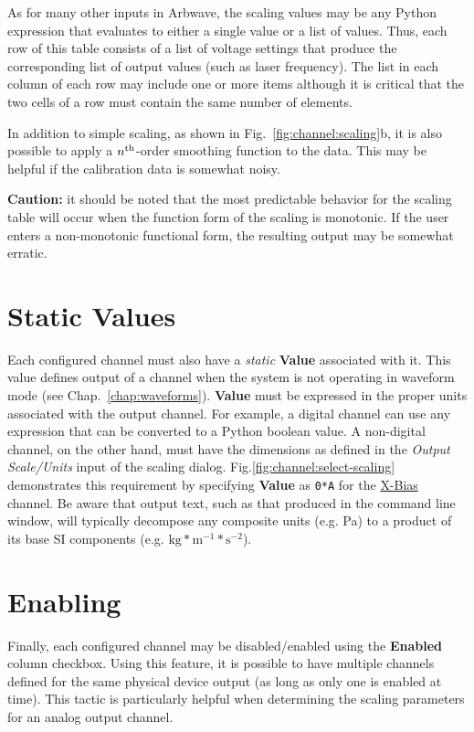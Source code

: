 As for many other inputs in Arbwave, the scaling values may be any Python
expression that evaluates to either a single value or a list of values.  Thus,
each row of this table consists of a list of voltage settings that produce the
corresponding list of output values (such as laser frequency).  The list in each
column of each row may include one or more items although it is critical that
the two cells of a row must contain the same number of elements.

In addition to simple scaling, as shown in Fig.~\ref{fig:channel:scaling}b, it is
also possible to apply a $n^{\rm th}$-order smoothing function to the data.
This may be helpful if the calibration data is somewhat noisy.

\textbf{Caution:}  it should be noted that the most predictable behavior for the
scaling table will occur when the function form of the scaling is monotonic.  If
the user enters a non-monotonic functional form, the resulting output may be
somewhat erratic.

\section{Static Values}\label{sec:channels:static}
Each configured channel must also have a \textit{static} \textbf{Value}
associated with it.  This value defines output of a channel when
the system is not operating in waveform mode (see Chap.~\ref{chap:waveforms}).
\textbf{Value} must be expressed in the proper units associated with the output
channel.  For example, a digital channel can use any expression that can be
converted to a Python boolean value.  A non-digital channel, on the other hand,
must have the dimensions as defined in the \textit{Output Scale/Units} input of
the scaling dialog.  Fig.\ref{fig:channel:select-scaling} demonstrates this
requirement by specifying \textbf{Value} as \texttt{0*A} for the
\underline{X-Bias} channel.  Be aware that output text, such as that produced in
the command line window, will typically decompose
any composite units (e.g. Pa) to a product of its base SI components (e.g.
$\mathrm{kg}*\mathrm{m}^{-1}*\mathrm{s}^{-2}$).

\section{Enabling}\label{sec:channels:enable}
Finally, each configured channel may be disabled/enabled using the
\textbf{Enabled} column checkbox.  Using this feature, it is possible to have
multiple channels defined for the same physical device output (as long as only
one is enabled at time).  This tactic is particularly helpful when determining
the scaling parameters for an analog output channel.
